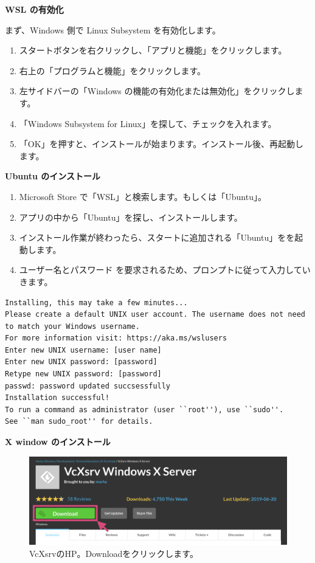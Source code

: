 \documentclass[10pt]{ujarticle}
\begin{document}
\vspace{1cm}
{\Large \bf WSL の有効化}
\vspace{0.5cm}

まず、Windows 側で Linux Subsystem を有効化します。
\begin{enumerate}
\item スタートボタンを右クリックし、「アプリと機能」をクリックします。
\item 右上の「プログラムと機能」をクリックします。
\item 左サイドバーの「Windows の機能の有効化または無効化」をクリックします。
\item 「Windows Subsystem for Linux」を探して、チェックを入れます。
\item 「OK」を押すと、インストールが始まります。インストール後、再起動します。
\end{enumerate}

\vspace{1cm}
{\Large \bf Ubuntu のインストール}
\vspace{0.5cm}

\begin{enumerate}
\item Microsoft Store で「WSL」と検索します。もしくは「Ubuntu」。
\item アプリの中から「Ubuntu」を探し、インストールします。
\item インストール作業が終わったら、スタートに追加される「Ubuntu」をを起動します。
\item ユーザー名とパスワード を要求されるため、プロンプトに従って入力していきます。
\end{enumerate}
\begin{lstlisting}[caption=表示されるスクリプト例]
Installing, this may take a few minutes...
Please create a default UNIX user account. The username does not need to match your Windows username.
For more information visit: https://aka.ms/wslusers
Enter new UNIX username: [user name]
Enter new UNIX password: [password]
Retype new UNIX password: [password]
passwd: password updated succsessfully
Installation successful!
To run a command as administrator (user ``root''), use ``sudo''.
See ``man sudo_root'' for details.
\end{lstlisting}

\vspace{1cm}
{\Large \bf X window のインストール}
\vspace{0.5cm}

\begin{figure}[h]
\begin{center}
\includegraphics[width=14cm]{VcXsrv.png}
\caption{VcXsrvのHP。Downloadをクリックします。}
\end{center}
\end{figure}
\end{document}
